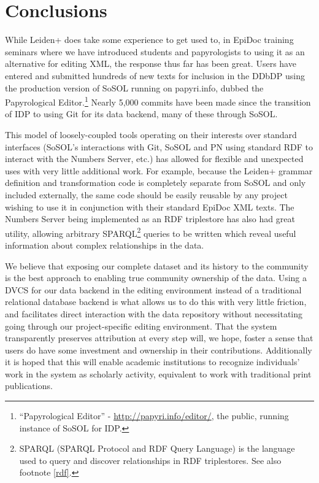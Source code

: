 \documentclass[]{article}
\begin{document}
\section*{Conclusions}

While Leiden+ does take some experience to get used to, in EpiDoc training seminars where we have introduced students and papyrologists to using it as an alternative for editing XML, the response thus far has been great. Users have entered and submitted hundreds of new texts for inclusion in the DDbDP using the production version of SoSOL running on papyri.info, dubbed the Papyrological Editor.\footnote{“Papyrological Editor” - \url{http://papyri.info/editor/}, the public, running instance of SoSOL for IDP.} Nearly 5,000 commits have been made since the transition of IDP to using Git for its data backend, many of these through SoSOL.

This model of loosely-coupled tools operating on their interests over standard interfaces (SoSOL's interactions with Git, SoSOL and PN using standard RDF to interact with the Numbers Server, etc.) has allowed for flexible and unexpected uses with very little additional work. For example, because the Leiden+ grammar definition and transformation code is completely separate from SoSOL and only included externally, the same code should be easily reusable by any project wishing to use it in conjunction with their standard EpiDoc XML texts. The Numbers Server being implemented as an RDF triplestore has also had great utility, allowing arbitrary SPARQL\footnote{SPARQL (SPARQL Protocol and RDF Query Language) is the language used to query and discover relationships in RDF triplestores. See also footnote \ref{rdf}.} queries to be written which reveal useful information about complex relationships in the data.

We believe that exposing our complete dataset and its history to the community is the best approach to enabling true community ownership of the data. Using a DVCS for our data backend in the editing environment instead of a traditional relational database backend is what allows us to do this with very little friction, and facilitates direct interaction with the data repository without necessitating going through our project-specific editing environment. That the system transparently preserves attribution at every step will, we hope, foster a sense that users do have some investment and ownership in their contributions. Additionally it is hoped that this will enable academic institutions to recognize individuals' work in the system as scholarly activity, equivalent to work with traditional print publications.
\end{document}
